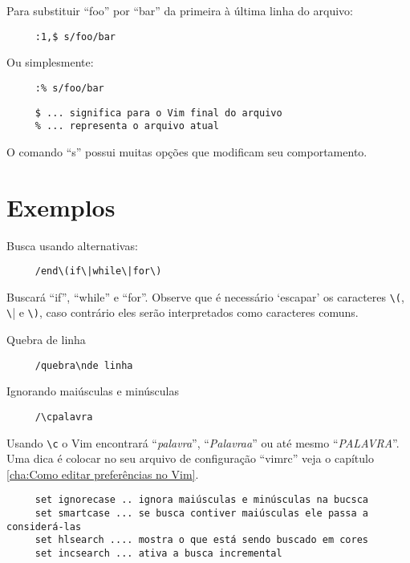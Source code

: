 Para substituir ``foo'' por ``bar'' da primeira à última linha do arquivo:

\begin{verbatim}
     :1,$ s/foo/bar
\end{verbatim}

Ou simplesmente:

\begin{verbatim}
     :% s/foo/bar
\end{verbatim}

\begin{verbatim}
     $ ... significa para o Vim final do arquivo
     % ... representa o arquivo atual
\end{verbatim}

O comando ``s'' possui muitas opções que modificam seu comportamento.

\section{Exemplos }
\label{Exemplos }

Busca usando alternativas:

\begin{verbatim}
     /end\(if\|while\|for\)
\end{verbatim}

Buscará ``if'', ``while'' e ``for''.  Observe que é necessário `escapar' os
caracteres \verb|\(|, \verb|\|| e \verb|\)|, caso contrário eles serão
interpretados como caracteres comuns.

Quebra de linha

\begin{verbatim}
     /quebra\nde linha
\end{verbatim}

Ignorando maiúsculas e minúsculas

\begin{verbatim}
     /\cpalavra
\end{verbatim}

Usando \verb|\c| o Vim encontrará ``{\em{palavra}}'', ``{\em{Palavraa}}'' ou
até mesmo ``{\em{PALAVRA}}''. Uma dica é colocar no seu arquivo de
configuração ``vimrc'' veja o capítulo \ref{cha:Como editar preferências no Vim}.

\begin{verbatim}
     set ignorecase .. ignora maiúsculas e minúsculas na bucsca
     set smartcase ... se busca contiver maiúsculas ele passa a considerá-las
     set hlsearch .... mostra o que está sendo buscado em cores
     set incsearch ... ativa a busca incremental
\end{verbatim}

